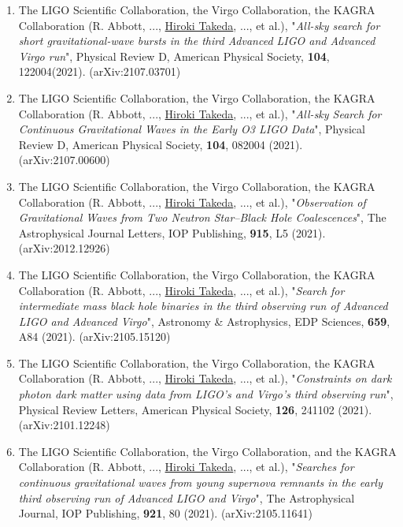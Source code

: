 \documentclass[uplatex, 11pt]{jsarticle}
\begin{document}
\begin{enumerate}
\item The LIGO Scientific Collaboration, the Virgo Collaboration, the KAGRA Collaboration (R. Abbott, ..., \uline{Hiroki Takeda}, ..., et al.), "\emph{All-sky search for short gravitational-wave bursts in the third Advanced LIGO and Advanced Virgo run}", Physical Review D, American Physical Society, {\bf 104}, 122004(2021). (arXiv:2107.03701)\\

\item The LIGO Scientific Collaboration, the Virgo Collaboration, the KAGRA Collaboration (R. Abbott, ..., \uline{Hiroki Takeda}, ..., et al.), "\emph{All-sky Search for Continuous Gravitational Waves in the Early O3 LIGO Data}", Physical Review D, American Physical Society, {\bf 104}, 082004 (2021). (arXiv:2107.00600)\\

\item The LIGO Scientific Collaboration, the Virgo Collaboration, the KAGRA Collaboration (R. Abbott, ..., \uline{Hiroki Takeda}, ..., et al.), "\emph{Observation of Gravitational Waves from Two Neutron Star–Black Hole Coalescences}", The Astrophysical Journal Letters, IOP Publishing, {\bf 915}, L5 (2021). (arXiv:2012.12926)\\

\item The LIGO Scientific Collaboration, the Virgo Collaboration, the KAGRA Collaboration (R. Abbott, ..., \uline{Hiroki Takeda}, ..., et al.), "\emph{Search for intermediate mass black hole binaries in the third observing run of Advanced LIGO and Advanced Virgo}", Astronomy \& Astrophysics, EDP Sciences, {\bf 659}, A84 (2021). (arXiv:2105.15120)\\

\item The LIGO Scientific Collaboration, the Virgo Collaboration, the KAGRA Collaboration (R. Abbott, ..., \uline{Hiroki Takeda}, ..., et al.), "\emph{Constraints on dark photon dark matter using data from LIGO's and Virgo's third observing run}", Physical Review Letters, American Physical Society, {\bf 126}, 241102 (2021). (arXiv:2101.12248)\\

\item The LIGO Scientific Collaboration, the Virgo Collaboration, and the KAGRA Collaboration (R. Abbott, ..., \uline{Hiroki Takeda}, ..., et al.), "\emph{Searches for continuous gravitational waves from young supernova remnants in the early third observing run of Advanced LIGO and Virgo}", The Astrophysical Journal, IOP Publishing, {\bf 921}, 80 (2021). (arXiv:2105.11641)\\


\end{enumerate}
\end{document}
